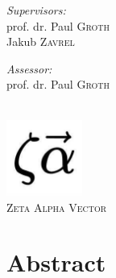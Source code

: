 \documentclass[12pt]{extreport}
\begin{document}
\begin{titlepage}
\noindent
\begin{minipage}[t]{0.4\textwidth}
\begin{flushleft} \large
\emph{Supervisors:} \\
prof. dr. Paul \textsc{Groth}\\
Jakub \textsc{Zavrel}
\end{flushleft}
\end{minipage}
\begin{minipage}[t]{0.4\textwidth}
\begin{flushright} \large
\emph{Assessor:} \\
prof. dr. Paul \textsc{Groth}\\
\end{flushright}
\end{minipage}\\[2cm]


\includegraphics[width=2.5cm]{assets/logos/zeta-alpha-logo.jpg}\\ %
\textsc{\large Zeta Alpha Vector}\\[1.0cm] %
 

\vfill %

\end{titlepage}

\chapter*{Abstract}
\end{document}

